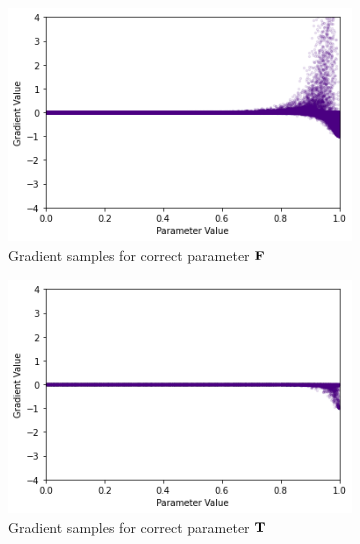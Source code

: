 \begin{figure}[h]
    \centering
    \begin{subfigure}[b]{0.47\textwidth}
        \centering
        \includegraphics[width=\textwidth]{imgs/grad_ss_bce_falseparam_100dim.png}
        \caption{Gradient samples for correct parameter $\textbf{F}$}
        \label{fig:conjgrad100falsessbce}
    \end{subfigure}
    \begin{subfigure}[b]{0.47\textwidth}
        \centering
        \includegraphics[width=\textwidth]{imgs/grad_ss_bce_trueparam_100dim.png}
        \caption{Gradient samples for correct parameter $\textbf{T}$}
        \label{fig:conjgrad100truessbce}
    \end{subfigure}
    \begin{subfigure}[b]{0.47\textwidth}
        \centering

\end{subfigure}
\end{figure}
